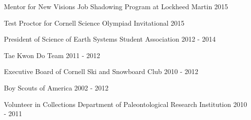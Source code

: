 
Mentor for New Visions Job Shadowing Program at Lockheed Martin \hfill 2015

Test Proctor for Cornell Science Olympiad Invitational \hfill 2015

President of Science of Earth Systems Student Association \hfill 2012 - 2014

Tae Kwon Do Team \hfill 2011 - 2012

Executive Board of Cornell Ski and Snowboard Club \hfill 2010 - 2012

Boy Scouts of America \hfill 2002 - 2012

Volunteer in Collections Department of Paleontological Research Institution \hfill 2010 - 2011

